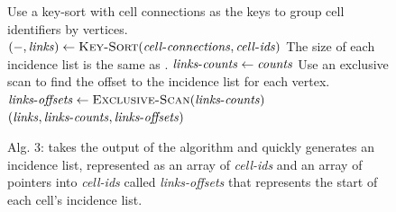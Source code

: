 \documentclass[10pt,journal,cspaper,compsoc]{IEEEtran}
\begin{document}
\noindent
\begin{figure}[hb]
\vspace{-0.4cm}
\begin{codebox}
  \zi \Comment Use a key-sort with cell connections as the keys to
  \zi \Comment group cell identifiers by vertices.
  \li $(-, \id{links}) \gets \proc{Key-Sort}(\id{cell-connections},\id{cell-ids})$
  \zi \Comment The size of each incidence list is the same as .
  \li $\id{links-counts} \gets \id{counts}$
  \zi \Comment Use an exclusive scan to find the offset to the incidence
  \zi \Comment list for each vertex.
  \li $\id{links-offsets} \gets \proc{Exclusive-Scan}(\id{links-counts})$
  \li \Return $(\id{links},\id{links-counts},\id{links-offsets})$
\end{codebox}
\vspace{-0.4cm}
\caption*{Alg. 3:  takes the output of the  algorithm and quickly generates an incidence list, represented as an array of \emph{cell-ids} and an array of pointers into \emph{cell-ids} called \emph{links-offsets} that represents the start of each cell's incidence list.}
\end{figure}
\end{document}
